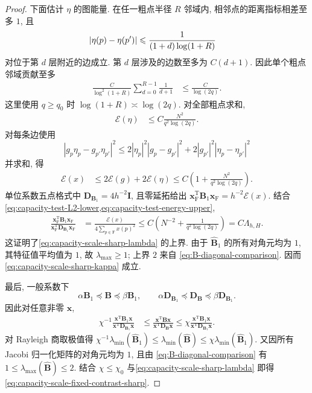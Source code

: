 \documentclass{ctexart}
\newcommand{\T}{\mathrm{T}}
\renewcommand{\ge}{\geqslant}
\renewcommand{\le}{\leqslant}
\DeclarePairedDelimiter\abs{\lvert}{\rvert}
\begin{document}
\begin{proof}
下面估计 $\eta$ 的图能量. 在任一粗点半径 $R$ 邻域内,
相邻点的距离指标相差至多 $1$, 且
\begin{align}
    \abs{\eta(p)-\eta(p')}
    &\le
    \frac1{(1+d)\log(1+R)}
    \label{eq:capacity-cutoff-edge-difference}
\end{align}
对位于第 $d$ 层附近的边成立.
第 $d$ 层涉及的边数至多为 $C(d+1)$.
因此单个粗点邻域贡献至多
\begin{align}
    \frac{C}{\log^2(1+R)}
    \sum_{d=0}^{R-1}\frac1{d+1}
    &\le
    \frac{C}{\log(2q)}.
    \label{eq:capacity-cutoff-single-energy}
\end{align}
这里使用 $q\ge q_0$ 时
$\log(1+R)\asymp\log(2q)$.
对全部粗点求和,
\begin{align}
    \mathcal E(\eta)
    &\le
    C\frac{N^2}{q^2\log(2q)}.
    \label{eq:capacity-cutoff-total-energy}
\end{align}
对每条边使用
\[
|g_p\eta_p-g_{p'}\eta_{p'}|^2
\le
2|\eta_p|^2|g_p-g_{p'}|^2
+2|g_{p'}|^2|\eta_p-\eta_{p'}|^2
\]
并求和, 得
\begin{align}
    \mathcal E(x)
    &\le
    2\mathcal E(g)+2\mathcal E(\eta)
    \le
    C\left(
      1+\frac{N^2}{q^2\log(2q)}
    \right).
    \label{eq:capacity-test-energy-upper}
\end{align}
单位系数五点格式中
$\bm D_{\bm B_1}=4h^{-2}\bm I$,
且零延拓给出
$\bm x_{\mathrm F}^\T\bm B_1\bm x_{\mathrm F}
=h^{-2}\mathcal E(x)$.
结合\cref{eq:capacity-test-L2-lower,eq:capacity-test-energy-upper},
\begin{align}
    \frac{
      \bm x_{\mathrm F}^\T\bm B_1\bm x_{\mathrm F}
    }{
      \bm x_{\mathrm F}^\T\bm D_{\bm B_1}\bm x_{\mathrm F}
    }
    &=
    \frac{\mathcal E(x)}
    {4\sum_{p\in\mathrm F}x(p)^2}
    \le
    C\left(
      N^{-2}+\frac1{q^2\log(2q)}
    \right)
    =
    C\Lambda_{h,H}.
    \label{eq:capacity-test-rayleigh-upper}
\end{align}
这证明了\cref{eq:capacity-scale-sharp-lambda} 的上界.
由于 $\widehat{\bm B}_1$ 的所有对角元均为 $1$,
其特征值平均值为 $1$, 故
$\lambda_{\max}\ge1$; 上界 $2$ 来自
\cref{eq:B-diagonal-comparison}. 因而
\cref{eq:capacity-scale-sharp-kappa} 成立.

最后, 一般系数下
\[
\alpha\bm B_1\preceq\bm B\preceq\beta\bm B_1,\qquad
\alpha\bm D_{\bm B_1}\preceq
\bm D_{\bm B}\preceq
\beta\bm D_{\bm B_1}.
\]
因此对任意非零 $\bm x$,
\begin{align}
    \chi^{-1}
    \frac{\bm x^\T\bm B_1\bm x}{\bm x^\T\bm D_{\bm B_1}\bm x}
    &\le
    \frac{\bm x^\T\bm B\bm x}{\bm x^\T\bm D_{\bm B}\bm x}
    \le
    \chi
    \frac{\bm x^\T\bm B_1\bm x}{\bm x^\T\bm D_{\bm B_1}\bm x}.
    \label{eq:variable-unit-jacobi-rayleigh-comparison}
\end{align}
对 Rayleigh 商取极值得
$\chi^{-1}\lambda_{\min}(\widehat{\bm B}_1)
\le\lambda_{\min}(\widehat{\bm B})
\le\chi\lambda_{\min}(\widehat{\bm B}_1)$.
又因所有 Jacobi 归一化矩阵的对角元均为 $1$, 且由
\cref{eq:B-diagonal-comparison} 有
$1\le\lambda_{\max}(\widehat{\bm B})\le2$.
结合 $\chi\le\chi_0$ 与\cref{eq:capacity-scale-sharp-lambda} 即得
\cref{eq:capacity-scale-fixed-contrast-sharp}.
\end{proof}



\end{document}
